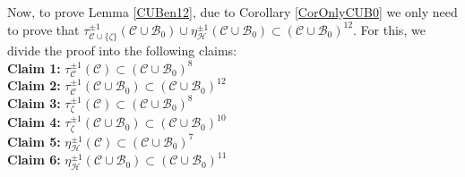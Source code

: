 \documentclass[twoside,11pt,a4paper]{article}
\newcommand*{\Cf}{\mathscr{C}}
\newcommand*{\Bf}{\mathscr{B}}
\newcommand*{\Hff}{\mathscr{H}}
\begin{document}
Now, to prove Lemma \ref{CUBen12}, due to Corollary \ref{CorOnlyCUB0} we only need to prove that $\tau_{\Cf \cup \{\zeta\}}^{\pm 1}(\Cf \cup \Bf_{0}) \cup \eta_{\Hff}^{\pm 1}(\Cf \cup \Bf_{0}) \subset (\Cf \cup \Bf_{0})^{12}$. For this, we divide the proof into the following claims:\\
\textbf{Claim 1:} $\tau_{\Cf}^{\pm 1}(\Cf) \subset (\Cf \cup \Bf_{0})^{8}$\\
\textbf{Claim 2:} $\tau_{\Cf}^{\pm 1}(\Cf \cup \Bf_{0}) \subset (\Cf \cup \Bf_{0})^{12}$\\
\textbf{Claim 3:} $\tau_{\zeta}^{\pm 1}(\Cf) \subset (\Cf \cup \Bf_{0})^{8}$\\
\textbf{Claim 4:} $\tau_{\zeta}^{\pm 1}(\Cf \cup \Bf_{0}) \subset (\Cf \cup \Bf_{0})^{10}$\\
\textbf{Claim 5:} $\eta_{\Hff}^{\pm 1}(\Cf) \subset (\Cf \cup \Bf_{0})^{7}$\\
\textbf{Claim 6:} $\eta_{\Hff}^{\pm 1}(\Cf \cup \Bf_{0}) \subset (\Cf \cup \Bf_{0})^{11}$
\end{document}
